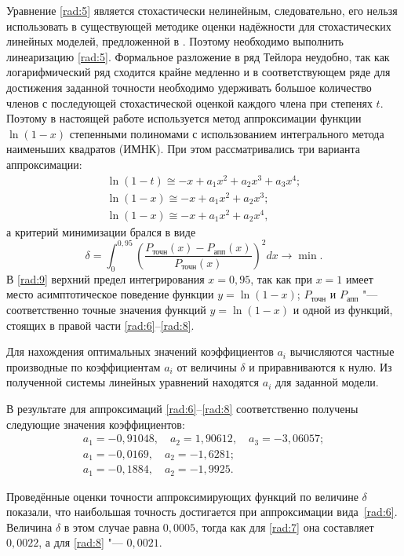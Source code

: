 Уравнение \eqref{rad:5} является стохастически нелинейным, следовательно, его нельзя использовать в существующей методике оценки надёжности для стохастических линейных моделей, предложенной в \cite{rad:bib:20}. 
Поэтому необходимо выполнить линеаризацию \eqref{rad:5}. 
Формальное разложение в ряд Тейлора неудобно, так как логарифмический ряд сходится крайне медленно и в соответствующем ряде для достижения заданной точности необходимо удерживать большое количество членов с последующей стохастической оценкой каждого члена при степенях $t$. 
Поэтому в настоящей работе используется метод аппроксимации функции $\ln(1-x)$ степенными полиномами с использованием  интегрального метода наименьших квадратов (ИМНК). При этом рассматривались три варианта аппроксимации:
\begin{gather}
\ln(1-t)\cong-x+a_1x^2+a_2x^3+a_3x^4;
\label{rad:6}
\\
\ln(1-x)\cong-x+a_1x^2+a_2x^3;
\label{rad:7}
\\
\ln(1-x)\cong-x+a_1x^2+a_2x^4,
\label{rad:8}
\end{gather}
а критерий минимизации брался в виде
\begin{equation}
\delta=\int_{0}^{0,95}\left(\frac{P_{\text{точн}}(x)-P_{\text{апп}}(x)}{P_{\text{точн}}(x)}\right)^2dx\to\min.
\label{rad:9}
\end{equation}
В \eqref{rad:9} верхний предел интегрирования $x=0,95$, так как при $x=1$ имеет место асимптотическое поведение функции $y=\ln(1-x)$; $P_{\text{точн}}$ и $P_{\text{апп}}$ "--- соответственно точные значения функций $y=\ln(1-x)$ и одной из функций, стоящих в правой части \eqref{rad:6}--\eqref{rad:8}.

Для нахождения оптимальных значений коэффициентов $a_i$ вычисляются частные производные по коэффициентам $a_i$ от величины $\delta$ и приравниваются к нулю. Из полученной системы линейных уравнений находятся $a_i$ для заданной модели.

В результате для аппроксимаций \eqref{rad:6}--\eqref{rad:8} соответственно получены следующие значения коэффициентов:
\begin{gather}
a_1=-0,91048, \quad a_2=1,90612, \quad a_3=-3,06057;
\label{rad:10}
\\
a_1=-0,0169, \quad a_2=-1,6281;
\label{rad:11}
\\
a_1=-0,1884, \quad a_2=-1,9925.
\label{rad:12}
\end{gather}

Проведённые оценки точности аппроксимирующих функций по величине $\delta$ показали, что наибольшая точность достигается  при аппроксимации вида~\eqref{rad:6}. 
Величина $\delta$ в этом случае равна $0,0005$, тогда как для \eqref{rad:7} она составляет $0,0022$, а для \eqref{rad:8} "--- $0,0021$.

